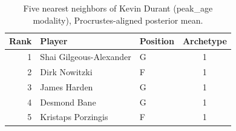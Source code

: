 \begin{table}[htbp]
  \centering\small
  \begin{tabular}{rllc}
    \toprule
    Rank & Player & Position & Archetype \\
    \midrule
    1 & Shai Gilgeous-Alexander & G & 1 \\
    2 & Dirk Nowitzki & F & 1 \\
    3 & James Harden & G & 1 \\
    4 & Desmond Bane & G & 1 \\
    5 & Kristaps Porzingis & F & 1 \\
    \bottomrule
  \end{tabular}
  \caption{Five nearest neighbors of Kevin Durant (peak_age modality), Procrustes-aligned posterior mean.}
  \label{tab:Kevin_Durant_neighbors_peak_age}
\end{table}

